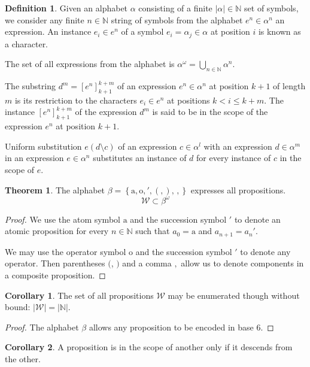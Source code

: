\documentclass{amsbook}
\newcommand{\setsm}[1]{\left\{#1\right\}}
\newcommand{\wffs}{\mathcal W}
\theoremstyle{definition}
\newtheorem{thm}{Theorem}[section]
\newtheorem{crl}{Corollary}[section]
\newtheorem{dfn}{Definition}[section]
\begin{document}
\begin{dfn}
    Given an alphabet $\alpha$ consisting of a finite $|\alpha| \in \mathbb N$ set of symbols, we consider any finite $n \in \mathbb N$ string of symbols from the alphabet $e^n \in \alpha^n$ an expression. An instance $e_i \in e^n$ of a symbol $e_i = \alpha_j \in \alpha$ at position $i$ is known as a character.

    The set of all expressions from the alphabet is $\alpha^\omega = \bigcup_{n \in \mathbb N} \alpha^n$.

    The substring $d^m = \left[ e^n \right]_{k+1}^{k+m}$ of an expression $e^n \in \alpha^n$ at position $k + 1$ of length $m$ is its restriction to the characters $e_i \in e^n$ at positions $k < i \leq k+m$. The instance $\left[ e^n \right]_{k+1}^{k+m}$ of the expression $d^m$ is said to be in the scope of the expression $e^n$ at position $k+1$.

    Uniform substitution $e(d \setminus c)$ of an expression $c \in \alpha^l$ with an expression $d \in \alpha^m$ in an expression $e \in \alpha^n$ substitutes an instance of $d$ for every instance of $c$ in the scope of $e$.
\end{dfn}

\begin{thm}
    The alphabet $\beta = \setsm{\mathrm a, \mathrm o, ', (, ),\,,}$ expresses all propositions.
    $$ \wffs \subset \beta^\omega $$
    \begin{proof}
        We use the atom symbol $\mathrm a$ and the succession symbol $'$ to denote an atomic proposition for every $n \in \mathbb N$ such that $a_0 = \mathrm a$ and $a_{n+1} = a_n'$.

        We may use the operator symbol $\mathrm o$ and the succession symbol $'$ to denote any operator. Then parentheses $($, $)$ and a comma $,$ allow us to denote components in a composite proposition.
    \end{proof}
\end{thm}

\begin{crl}
    The set of all propositions $\mathcal W$ may be enumerated though without bound: $|\wffs| = |\mathbb N|$.
    \begin{proof}
        The alphabet $\beta$ allows any proposition to be encoded in base $6$.
    \end{proof}
\end{crl}

\begin{crl}
    A proposition is in the scope of another only if it descends from the other.
\end{crl}
\end{document}
